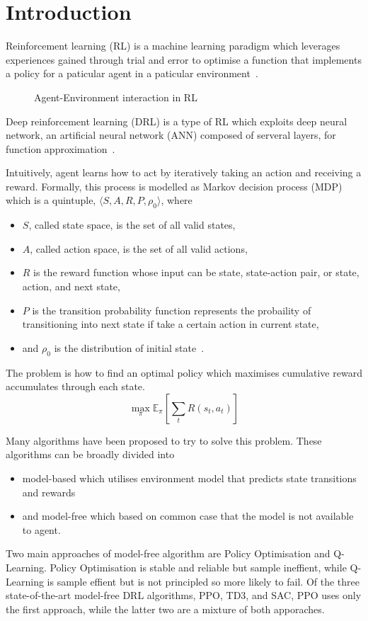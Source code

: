 \section{Introduction}

Reinforcement learning (RL) is a machine learning paradigm which leverages experiences gained through trial and error to optimise a function that implements a policy for a paticular agent in a paticular environment~\cite{SpinningUp2018}.

\begin{figure}[htbp]
   \centering
   
   \caption{Agent-Environment interaction in RL}
   \label{fig:agent-env-interaction}
\end{figure}

Deep reinforcement learning (DRL) is a type of RL which exploits deep neural network, an artificial neural network (ANN) composed of serveral layers, for function approximation~\cite{SpinningUp2018}.

Intuitively, agent learns how to act by iteratively taking an action and receiving a reward. Formally, this process is modelled as Markov decision process (MDP) which is a quintuple, $\langle S, A, R, P, \rho_0 \rangle$, where
\begin{itemize}
\item $S$, called state space, is the set of all valid states,
\item $A$, called action space, is the set of all valid actions,
\item $R$ is the reward function whose input can be state, state-action pair, or state, action, and next state,
\item $P$ is the transition probability function represents the probaility of transitioning into next state if take a certain action in current state,
\item and $\rho_0$ is the distribution of initial state~\cite{SpinningUp2018}.
\end{itemize}
The problem is how to find an optimal policy which maximises cumulative reward accumulates through each state.
\begin{displaymath}
\max_{\pi} \mathbb{E}_{\pi} \left[ \sum_{t} R(s_t,a_t) \right]
\end{displaymath}

Many algorithms have been proposed to try to solve this problem. These algorithms can be broadly divided into
\begin{itemize}
\item model-based which utilises environment model that predicts state transitions and rewards
\item and model-free which based on common case that the model is not available to agent.
\end{itemize}
Two main approaches of model-free algorithm are Policy Optimisation and Q-Learning. Policy Optimisation is stable and reliable but sample ineffient, while Q-Learning is sample effient but is not principled so more likely to fail. Of the three state-of-the-art model-free DRL algorithms, PPO, TD3, and SAC, PPO uses only the first approach, while the latter two are a mixture of both apporaches.

